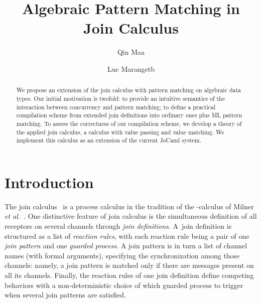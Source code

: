 \documentclass{LMCS}
\makeatletter
\newcommand{\etal}{\emph{et al.}\@\xspace}
\newcommand{\jocaml}{\textrm{JoCaml}\xspace}
\renewcommand{\_}{\mathord{\rule[-.25ex]{1ex}{.15ex}}}
\makeatother
\begin{document}
\title{Algebraic Pattern Matching in Join Calculus\rsuper *}

\author[Q.~Ma]{Qin Ma\rsuper a}
\address{{\lsuper a}OFFIS, Escherweg 2, 26121 Oldenburg, Germany}

\author[L.~Maranget]{Luc Maranget\rsuper b}
\address{{\lsuper b}INRIA-Rocquencourt, BP 105, 78153 Le Chesnay Cedex, France}



\begin{abstract}
We propose an extension of the join calculus with pattern matching on
  algebraic data types. Our initial motivation is twofold: to provide an
  intuitive semantics of the interaction between concurrency and pattern
  matching; to define a practical compilation scheme from extended join
  definitions into ordinary ones plus ML pattern matching. To assess the
  correctness of our compilation scheme, we develop a theory of the applied
  join calculus, a calculus with value passing and value matching. We
  implement this calculus as an extension of the current \jocaml system.
\end{abstract}

\maketitle



\section{Introduction}


\label{sec.intro}

The join calculus~\cite{Fournet98:PhD,FournetGonthier96} is a process
calculus in the tradition of the -calculus of Milner
\etal~\cite{MPW92}. One distinctive feature of join calculus is the
simultaneous definition of all receptors on several channels through
\emph{join definitions}. A~join definition is structured as a list of
\emph{reaction rules}, with each reaction rule being a pair of one
\emph{join pattern} and one \emph{guarded process}. A join pattern is
in turn a list of channel names (with formal arguments), specifying
the synchronization among those channels: namely, a join pattern is
matched only if there are messages present on all its channels.
Finally, the reaction rules of one join definition define competing
behaviors with a non-deterministic choice of which guarded process to
trigger when several join patterns are satisfied.
\end{document}
